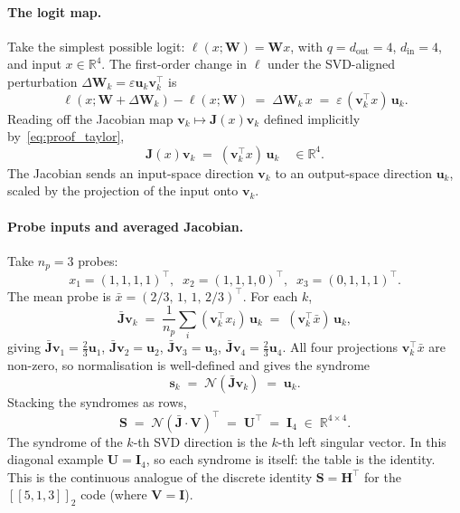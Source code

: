 \documentclass[11pt,a4paper]{article}
\theoremstyle{definition}
\newcommand{\Wm}{\mathbf{W}}
\newcommand{\Um}{\mathbf{U}}
\newcommand{\Vm}{\mathbf{V}}
\newcommand{\Sm}{\mathbf{S}}
\newcommand{\Jm}{\mathbf{J}}
\newcommand{\Hm}{\mathbf{H}}
\newcommand{\Imat}{\mathbf{I}}
\newcommand{\vk}[1][]{\mathbf{v}_{#1}}
\newcommand{\uk}[1][]{\mathbf{u}_{#1}}
\newcommand{\sk}[1][]{\mathbf{s}_{#1}}
\newcommand{\Rbb}{\mathbb{R}}
\newcommand{\Nop}{\mathcal{N}}
\newcommand{\dimin}{d_{\mathrm{in}}}
\newcommand{\dimout}{d_{\mathrm{out}}}
\begin{document}
\paragraph{The logit map.}
Take the simplest possible logit: $\ell(x; \Wm) = \Wm x$, with $q = \dimout = 4$, $\dimin = 4$, and input $x\in\Rbb^4$. The first-order change in $\ell$ under the SVD-aligned perturbation $\Delta\Wm_k = \varepsilon\uk[k]\vk[k]^\top$ is
\[
  \ell(x;\Wm+\Delta\Wm_k) - \ell(x;\Wm)
  \;=\; \Delta\Wm_k\, x
  \;=\; \varepsilon\,(\vk[k]^\top x)\,\uk[k] .
\]
Reading off the Jacobian map $\vk[k] \mapsto \Jm(x)\vk[k]$ defined implicitly by~\eqref{eq:proof_taylor},
\[
  \Jm(x)\vk[k] \;=\; (\vk[k]^\top x)\,\uk[k] \quad\in\Rbb^4 .
\]
The Jacobian sends an input-space direction $\vk[k]$ to an output-space direction $\uk[k]$, scaled by the projection of the input onto $\vk[k]$.

\paragraph{Probe inputs and averaged Jacobian.}
Take $n_p = 3$ probes:
\[
  x_1 = (1, 1, 1, 1)^\top,\;\;
  x_2 = (1, 1, 1, 0)^\top,\;\;
  x_3 = (0, 1, 1, 1)^\top .
\]
The mean probe is $\bar{x} = (2/3,\,1,\,1,\,2/3)^\top$. For each $k$,
\[
  \bar{\Jm}\vk[k]
  \;=\; \frac{1}{n_p}\sum_i (\vk[k]^\top x_i)\,\uk[k]
  \;=\; (\vk[k]^\top \bar{x})\,\uk[k] ,
\]
giving $\bar{\Jm}\vk[1] = \tfrac{2}{3}\uk[1]$, $\bar{\Jm}\vk[2] = \uk[2]$, $\bar{\Jm}\vk[3] = \uk[3]$, $\bar{\Jm}\vk[4] = \tfrac{2}{3}\uk[4]$. All four projections $\vk[k]^\top \bar{x}$ are non-zero, so normalisation is well-defined and gives the syndrome
\[
  \sk[k] \;=\; \Nop(\bar{\Jm}\vk[k]) \;=\; \uk[k] .
\]
Stacking the syndromes as rows,
\[
  \Sm \;=\; \Nop(\bar{\Jm}\cdot\Vm)^\top \;=\; \Um^\top \;=\; \Imat_4
  \;\in\;\Rbb^{4\times 4} .
\]
The syndrome of the $k$-th SVD direction is the $k$-th left singular vector. In this diagonal example $\Um = \Imat_4$, so each syndrome is itself: the table is the identity. This is the continuous analogue of the discrete identity $\Sm = \Hm^\top$ for the $[\![5,1,3]\!]_2$ code (where $\Vm = \Imat$).
\end{document}
